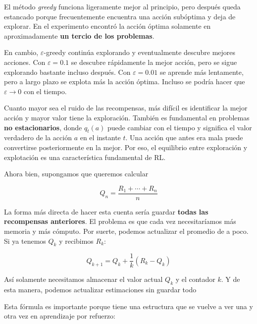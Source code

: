 \documentclass[11pt,a4paper]{article}
\begin{document}
El método \textit{greedy} funciona ligeramente mejor al principio, pero después
queda estancado porque frecuentemente encuentra una acción subóptima y deja de
explorar. En el experimento encontró la acción óptima solamente en
aproximadamente \textbf{un tercio de los problemas}.

En cambio, $\varepsilon$-greedy continúa explorando y eventualmente descubre
mejores acciones. Con $\varepsilon=0.1$ se descubre rápidamente la mejor acción,
pero se sigue explorando bastante incluso después. Con $\varepsilon=0.01$ se
aprende más lentamente, pero a largo plazo se explota más la acción óptima.
Incluso se podría hacer que $\varepsilon\longrightarrow 0$ con el tiempo.

Cuanto mayor sea el ruido de las recompensas, más difícil es identificar la
mejor acción y mayor valor tiene la exploración. También es fundamental en
problemas \textbf{no estacionarios}, donde $q_t(a)$ puede cambiar con el tiempo y significa el valor verdadero de la acción $a$ en el instante $t$. Una acción que antes era mala puede convertirse posteriormente en la mejor. Por eso, el equilibrio entre exploración y explotación es una característica fundamental de RL.

Ahora bien, supongamos que queremos calcular

\begin{equation}
    Q_n=\frac{R_1+\cdots+R_n}{n}
\end{equation}

La forma más directa de hacer esta cuenta sería guardar \textbf{todas las
recompensas anteriores}. El problema es que cada vez necesitaríamos más memoria
y más cómputo. Por suerte, podemos actualizar el promedio de a poco. Si ya
tenemos $Q_k$ y recibimos $R_k$:

\begin{equation}
    \boxed{Q_{k+1}=Q_k+\frac{1}{k}\left(R_k-Q_k\right)}
\end{equation}
  
Así solamente necesitamos almacenar el valor actual $Q_k$ y el contador $k$. Y de esta
manera, podemos actualizar estimaciones sin guardar todo


Esta fórmula es importante porque tiene una estructura que se vuelve a ver
una y otra vez en aprendizaje por refuerzo:
\end{document}

